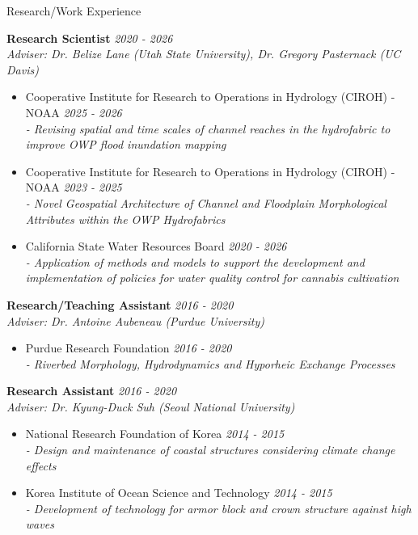 \documentclass{resume_anzy} %
\begin{document}
\begin{rSection}{Research/Work Experience}



{\bf Research Scientist} \hfill {\em 2020 - 2026} \\ 
\textit{Adviser: Dr. Belize Lane (Utah State University), Dr. Gregory Pasternack (UC Davis)}

\begin{itemize}
\item Cooperative Institute for Research to Operations in Hydrology (CIROH) - NOAA \hfill {\em 2025 - 2026} \\  \textit{- Revising spatial and time scales of channel reaches in the hydrofabric to improve OWP flood inundation mapping}

\item Cooperative Institute for Research to Operations in Hydrology (CIROH) - NOAA \hfill {\em 2023 - 2025} \\  \textit{- Novel Geospatial Architecture of Channel and Floodplain Morphological Attributes within the OWP Hydrofabrics}

\item California State Water Resources Board \hfill {\em 2020 - 2026} \\ \textit{ - Application of methods and models to support the development and implementation of policies for water quality control for cannabis cultivation}
\end{itemize}

{\bf Research/Teaching Assistant} \hfill {\em 2016 - 2020} \\ 
\textit{Adviser: Dr. Antoine Aubeneau (Purdue University)} 

\begin{itemize}

\item Purdue Research Foundation \hfill {\em 2016 - 2020} \\ \textit{- Riverbed Morphology, Hydrodynamics and Hyporheic Exchange Processes}

\end{itemize}

{\bf Research Assistant} \hfill {\em 2016 - 2020} \\ 
\textit{Adviser: Dr. Kyung-Duck Suh (Seoul National University)}

\begin{itemize}

\item National Research Foundation of Korea \hfill {\em 2014 - 2015} \\ \textit{- Design and maintenance of coastal structures considering climate change effects}

\item Korea Institute of Ocean Science and Technology \hfill {\em 2014 - 2015} \\ \textit{- Development of technology for armor block and crown structure against high waves}

\end{itemize}

\end{rSection}
\end{document}

